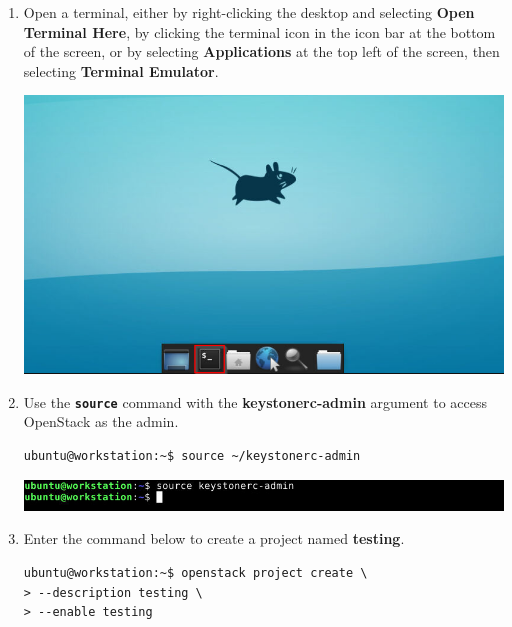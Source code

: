 \documentclass[letterpaper, 12pt]{article}
\begin{document}
\begin{enumerate}    
    \item Open a terminal, either by right-clicking the desktop and selecting \textbf{Open Terminal Here}, by clicking
    the terminal icon in the icon bar at the bottom of the screen, or by selecting \textbf{Applications} at the top
    left of the screen, then selecting \textbf{Terminal Emulator}.

    \begin{center}
        \includegraphics[width=\linewidth]{images/part2/step1.png}
    \end{center}

    \item Use the \textbf{\texttt{source}} command with the \textbf{keystonerc-admin} argument to access OpenStack
    as the admin.
\begin{lstlisting}
ubuntu@workstation:~$ source ~/keystonerc-admin
\end{lstlisting}
    
    \begin{center}
        \includegraphics[width=\linewidth]{images/part2/step2.png}
    \end{center}

    \item Enter the command below to create a project named \textbf{testing}.
\begin{lstlisting}
ubuntu@workstation:~$ openstack project create \
> --description testing \
> --enable testing
\end{lstlisting}


\end{enumerate}
\end{document}

